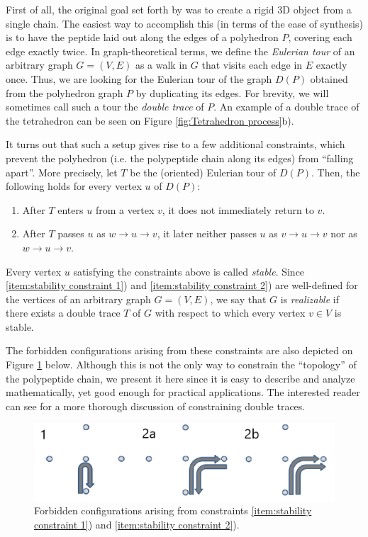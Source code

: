 \documentclass[12pt,a4paper,titlepage,openany]{report}
\begin{document}
First of all, the original goal set forth by \cite{gradivsar2013design} was to create a rigid 3D object from a single chain. The easiest way to accomplish this (in terms of the ease of synthesis) is to have the peptide laid out along the edges of a polyhedron $P$, covering each edge exactly twice. In graph-theoretical terms, we define the \emph{Eulerian tour} of an arbitrary graph $G=(V, E)$ as a walk in $G$ that visits each edge in $E$ exactly once. Thus, we are looking for the Eulerian tour of the graph $D(P)$ obtained from the polyhedron graph $P$ by duplicating its edges. For brevity, we will sometimes call such a tour the \emph{double trace} of $P$. An example of a double trace of the tetrahedron can be seen on Figure \ref{fig:Tetrahedron process}b).

It turns out that such a setup gives rise to a few additional constraints, which prevent the polyhedron (i.e. the polypeptide chain along its edges) from ``falling apart''. More precisely, let $T$ be the (oriented) Eulerian tour of $D(P)$. Then, the following holds for every vertex $u$ of $D(P)$:
\begin{enumerate}[1)]
	\item After $T$ enters $u$ from a vertex $v$, it does not immediately return to $v$. \label{item:stability constraint 1}
	\item After $T$ passes $u$ as $w\to u \to v$, it later neither passes $u$ as $v\to u \to v$ nor as $w\to u \to v$. \label{item:stability constraint 2}
\end{enumerate}

Every vertex $u$ satisfying the constraints above is called \emph{stable}. Since \ref{item:stability constraint 1}) and \ref{item:stability constraint 2}) are well-defined for the vertices of an arbitrary graph $G=(V, E)$, we say that $G$ is \emph{realizable} if there exists a double trace $T$ of $G$ with respect to which every vertex $v \in V$ is stable.

The forbidden configurations arising from these constraints are also depicted on Figure \ref{fig:Forbidden configurations} below. Although this is not the only way to constrain the ``topology'' of the polypeptide chain, we present it here since it is easy to describe and analyze mathematically, yet good enough for practical applications. The interested reader can see \cite{kovcar2015topofold} for a more thorough discussion of constraining double traces.

\begin{figure}[h]
	\centering
	\includegraphics[width=\linewidth]{forbidden_paths.png}
	\caption{Forbidden configurations arising from constraints \ref{item:stability constraint 1}) and \ref{item:stability constraint 2}).}
	\label{fig:Forbidden configurations}
\end{figure}
\end{document}
